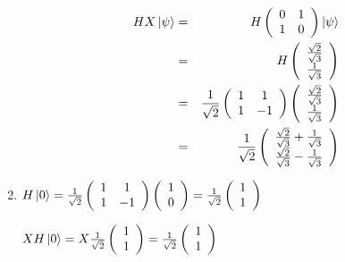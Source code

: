 \documentclass[11pt,fleqn]{article}
\begin{document}
\begin{enumerate}
\begin{eqnarray}
HX\left\vert{\psi}\right\rangle &=& H\left( \begin{array}{cc}
						0 & 1  \\
						1 & 0  \end{array} \right)\left\vert{\psi}\right\rangle \\
&=& H\left( \begin{array}{cc}
						\frac{\sqrt{2}}{\sqrt{3}}   \\
						\frac{1}{\sqrt{3}}   \end{array} \right)\\
&=& \frac{1}{\sqrt{2}}\left( \begin{array}{cc}
						1 & 1   \\
						1 & -1  \end{array} \right)\left( \begin{array}{cc}
						\frac{\sqrt{2}}{\sqrt{3}}   \\
						\frac{1}{\sqrt{3}}   \end{array} \right) \\
&=& \frac{1}{\sqrt{2}} \left( \begin{array}{cc}
						\frac{\sqrt{2}}{\sqrt{3}}  +\frac{1}{\sqrt{3}} \\
						\frac{\sqrt{2}}{\sqrt{3}} -\frac{1}{\sqrt{3}}   \end{array} \right)
\end{eqnarray}

\item %
$H\left\vert{0}\right\rangle = \frac{1}{\sqrt{2}}\left( \begin{array}{cc}
						1 & 1   \\
						1 & -1  \end{array} \right)\left( \begin{array}{cc}
						1   \\
						0   \end{array} \right) =  \frac{1}{\sqrt{2}}\left( \begin{array}{cc}
						1   \\
						1   \end{array} \right)$

$XH\left\vert{0}\right\rangle =X\frac{1}{\sqrt{2}}\left( \begin{array}{cc}
						1   \\
						1   \end{array} \right) = \frac{1}{\sqrt{2}}\left( \begin{array}{cc}
						1   \\
						1   \end{array} \right)$



\end{enumerate}
\end{document}
